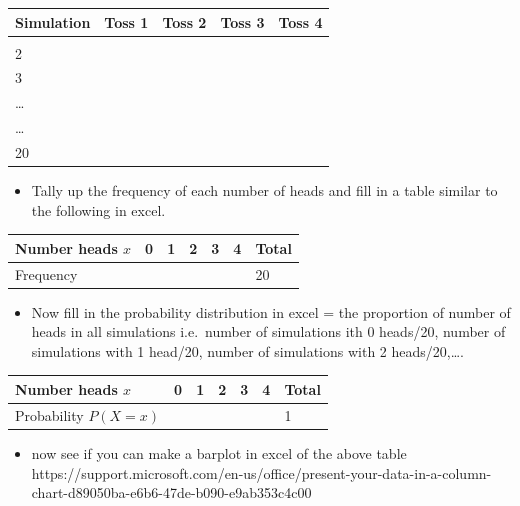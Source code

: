 \documentclass[
  10pt,
  letterpaper,
  DIV=11,
  numbers=noendperiod]{scrartcl}
\providecommand{\tightlist}{%
  \setlength{\itemsep}{0pt}\setlength{\parskip}{0pt}}\usepackage{longtable,booktabs,array}
\begin{document}
\begin{longtable}[]{@{}lllll@{}}
\toprule\noalign{}
Simulation & Toss 1 & Toss 2 & Toss 3 & Toss 4 \\
\midrule\noalign{}
\endhead
\bottomrule\noalign{}
\endlastfoot
1 & & & & \\
2 & & & & \\
3 & & & & \\
\ldots{} & & & & \\
\ldots{} & & & & \\
20 & & & & \\
\end{longtable}

\begin{itemize}
\tightlist
\item
  Tally up the frequency of each number of heads and fill in a table
  similar to the following in excel.
\end{itemize}

\begin{longtable}[]{@{}lllllll@{}}
\toprule\noalign{}
Number heads \(x\) & 0 & 1 & 2 & 3 & 4 & Total \\
\midrule\noalign{}
\endhead
\bottomrule\noalign{}
\endlastfoot
Frequency & & & & & & 20 \\
\end{longtable}

\begin{itemize}
\tightlist
\item
  Now fill in the probability distribution in excel = the proportion of
  number of heads in all simulations i.e.~number of simulations ith 0
  heads/20, number of simulations with 1 head/20, number of simulations
  with 2 heads/20,\ldots.
\end{itemize}

\begin{longtable}[]{@{}lllllll@{}}
\toprule\noalign{}
Number heads \(x\) & 0 & 1 & 2 & 3 & 4 & Total \\
\midrule\noalign{}
\endhead
\bottomrule\noalign{}
\endlastfoot
Probability \(P(X=x)\) & & & & & & 1 \\
\end{longtable}

\begin{itemize}
\tightlist
\item
  now see if you can make a barplot in excel of the above table
  https://support.microsoft.com/en-us/office/present-your-data-in-a-column-chart-d89050ba-e6b6-47de-b090-e9ab353c4c00
\end{itemize}
\end{document}
